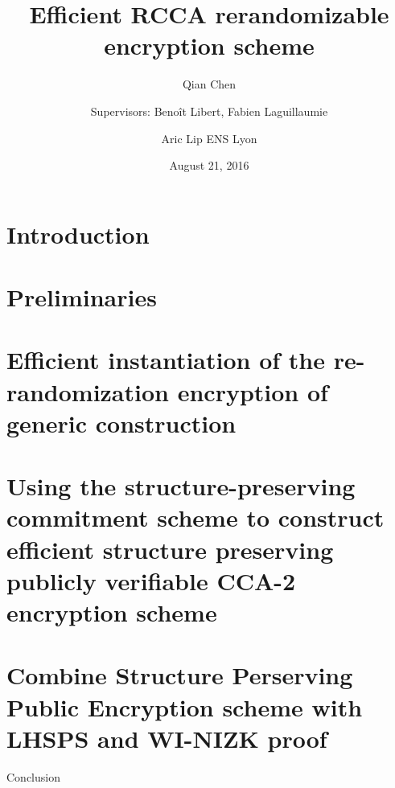 \documentclass[11pt]{article}
\begin{document}
\title{Efficient RCCA rerandomizable encryption scheme}

\author{Qian Chen \and Supervisors: Beno\^it Libert, Fabien Laguillaumie \and Aric Lip ENS Lyon}
\date{August 21, 2016}

\maketitle

\thispagestyle{empty}



\section{Introduction}


\newpage

\section{Preliminaries}



\section{Efficient instantiation of the re-randomization encryption of generic construction~\cite{DBLP:conf/eurocrypt/ChaseKLM12}}


\section{Using the structure-preserving commitment scheme to construct efficient structure preserving publicly verifiable CCA-2 encryption scheme}


\section{Combine Structure Perserving Public Encryption scheme with LHSPS and WI-NIZK proof}


\begin{section}{Conclusion}
  
\end{section}

\newpage

\printbibliography
\end{document}
